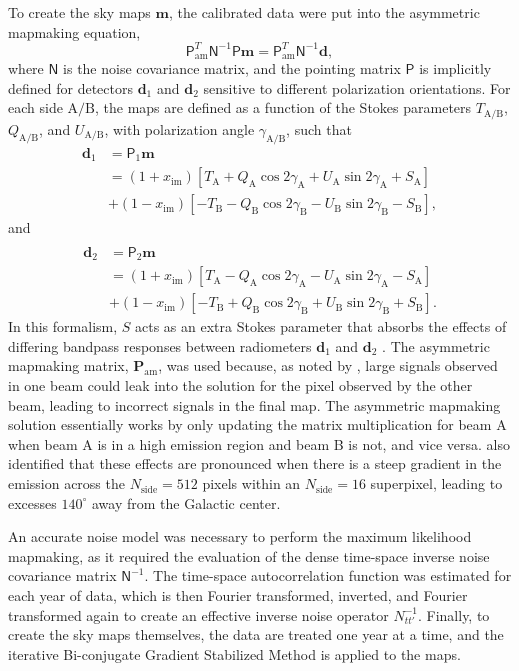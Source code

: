 \documentclass[twocolumn]{../../common/aa}
\newcommand{\A}[0]{\mathrm{A}}
\newcommand{\B}[0]{\mathrm{B}}
\begin{document}
To create the sky maps $\boldsymbol m$, the calibrated data were put into the asymmetric mapmaking equation,
\begin{equation}
	\mathsf P_\mathrm{am}^T\mathsf N^{-1}\mathsf P\boldsymbol m=\mathsf P^T_\mathrm{am}\mathsf N^{-1}\boldsymbol d,
\end{equation}
where $\mathsf N$ is the noise covariance matrix, and the pointing matrix $\mathsf P$ is implicitly defined for detectors $\boldsymbol d_1$ and $\boldsymbol d_2$ sensitive to different polarization orientations. For each side $\A/\B$, the maps are defined as a function of the Stokes parameters $T_{\A/\B}$, $Q_{\A/\B}$, and $U_{\A/\B}$, with polarization angle $\gamma_{\A/\B}$, such that
\begin{align}
	\boldsymbol d_1&=\mathsf P_1\boldsymbol m
	\nonumber
	\\
	&=(1+x_\mathrm{im})[T_\A+Q_\A\cos2\gamma_\A+U_\A\sin2\gamma_\A+S_\A]
	\nonumber
	\\
	&+(1-x_\mathrm{im})[-T_\B-Q_\B\cos2\gamma_\B-U_\B\sin2\gamma_\B-S_\B],
\end{align}
and
\begin{align}
	\\
	\boldsymbol d_2&=\mathsf P_2\boldsymbol m
	\nonumber
	\\
	&=(1+x_\mathrm{im})[T_\A-Q_\A\cos2\gamma_\A-U_\A\sin2\gamma_\A-S_\A]
	\nonumber
	\\
	&+(1-x_\mathrm{im})[-T_\B+Q_\B\cos2\gamma_\B+U_\B\sin2\gamma_\B+S_\B].
\end{align}
In this formalism, $S$ acts as an extra Stokes parameter that absorbs the effects of differing bandpass responses between radiometers $\boldsymbol d_1$ and $\boldsymbol d_2$ \citep{jarosik2007}.
The asymmetric mapmaking matrix, $\boldsymbol P_\mathrm{am}$, was used because, as noted by \citet{jarosik2010}, large signals observed in one beam could leak into the solution for the pixel observed by the other beam, leading to incorrect signals in the final map. The asymmetric mapmaking solution essentially works by only updating the matrix multiplication for beam A when beam A is in a high emission region and beam B is not, and vice versa. \citet{bennett2012} also identified that these effects are pronounced when there is a steep gradient in the emission across the $N_\mathrm{side}=512$ pixels within an $N_\mathrm{side}=16$ superpixel, leading to excesses $140^\circ$ away from the Galactic center.

An accurate noise model was necessary to perform the maximum likelihood mapmaking, as it required the evaluation of the dense time-space inverse noise covariance matrix  $\mathsf N^{-1}$. The time-space autocorrelation function was estimated for each year of data, which is then Fourier transformed, inverted, and Fourier transformed again to create an effective inverse noise operator $N_{tt'}^{-1}$. 
Finally, to create the sky maps themselves, the data are treated one year at a time, and the iterative Bi-conjugate Gradient Stabilized Method \citep[BiCG-STAB][]{bicgstab,bicgstab_template} is applied to the maps.
\end{document}
